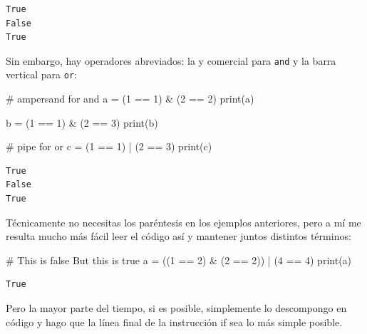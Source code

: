 \documentclass[
  letterpaper,
]{scrbook}
\newenvironment{Shaded}{\begin{snugshade}}{\end{snugshade}}
\newcommand{\BuiltInTok}[1]{\textcolor[rgb]{0.00,0.23,0.31}{#1}}
\newcommand{\CommentTok}[1]{\textcolor[rgb]{0.37,0.37,0.37}{#1}}
\newcommand{\DecValTok}[1]{\textcolor[rgb]{0.68,0.00,0.00}{#1}}
\newcommand{\NormalTok}[1]{\textcolor[rgb]{0.00,0.23,0.31}{#1}}
\newcommand{\OperatorTok}[1]{\textcolor[rgb]{0.37,0.37,0.37}{#1}}
\begin{document}
\begin{verbatim}
True
False
True
\end{verbatim}

Sin embargo, hay operadores abreviados: la y comercial para \texttt{and}
y la barra vertical para \texttt{or}:

\begin{Shaded}
\begin{Highlighting}[]
\CommentTok{\# ampersand for and}
\NormalTok{a }\OperatorTok{=}\NormalTok{ (}\DecValTok{1} \OperatorTok{==} \DecValTok{1}\NormalTok{) }\OperatorTok{\&}\NormalTok{ (}\DecValTok{2} \OperatorTok{==} \DecValTok{2}\NormalTok{)}
\BuiltInTok{print}\NormalTok{(a)}

\NormalTok{b }\OperatorTok{=}\NormalTok{ (}\DecValTok{1} \OperatorTok{==} \DecValTok{1}\NormalTok{) }\OperatorTok{\&}\NormalTok{ (}\DecValTok{2} \OperatorTok{==} \DecValTok{3}\NormalTok{)}
\BuiltInTok{print}\NormalTok{(b)}

\CommentTok{\# pipe for or}
\NormalTok{c }\OperatorTok{=}\NormalTok{ (}\DecValTok{1} \OperatorTok{==} \DecValTok{1}\NormalTok{) }\OperatorTok{|}\NormalTok{ (}\DecValTok{2} \OperatorTok{==} \DecValTok{3}\NormalTok{)}
\BuiltInTok{print}\NormalTok{(c)}
\end{Highlighting}
\end{Shaded}

\begin{verbatim}
True
False
True
\end{verbatim}

Técnicamente no necesitas los paréntesis en los ejemplos anteriores,
pero a mí me resulta mucho más fácil leer el código así y mantener
juntos distintos términos:

\begin{Shaded}
\begin{Highlighting}[]
\CommentTok{\#       This is false        But this is true}
\NormalTok{a }\OperatorTok{=}\NormalTok{ ((}\DecValTok{1} \OperatorTok{==} \DecValTok{2}\NormalTok{) }\OperatorTok{\&}\NormalTok{ (}\DecValTok{2} \OperatorTok{==} \DecValTok{2}\NormalTok{)) }\OperatorTok{|}\NormalTok{ (}\DecValTok{4} \OperatorTok{==} \DecValTok{4}\NormalTok{)}
\BuiltInTok{print}\NormalTok{(a)}
\end{Highlighting}
\end{Shaded}

\begin{verbatim}
True
\end{verbatim}

Pero la mayor parte del tiempo, si es posible, simplemente lo
descompongo en código y hago que la línea final de la instrucción if sea
lo más simple posible.
\end{document}
